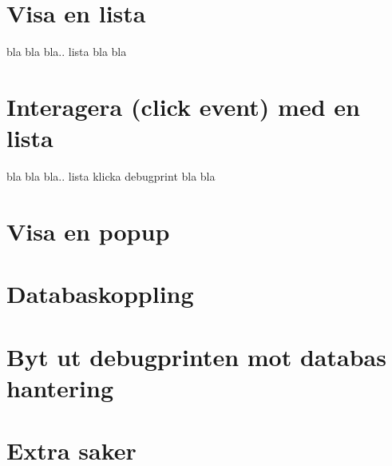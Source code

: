 \documentclass[11 pt]{article} %
\begin{document}
\section{Visa en lista}
bla bla bla.. lista bla bla

\section{Interagera (click event) med en lista}
bla bla bla.. lista klicka debugprint bla bla

\section{Visa en popup}

\section{Databaskoppling}

\section{Byt ut debugprinten mot databas hantering}

\section{Extra saker}


\end{document}

